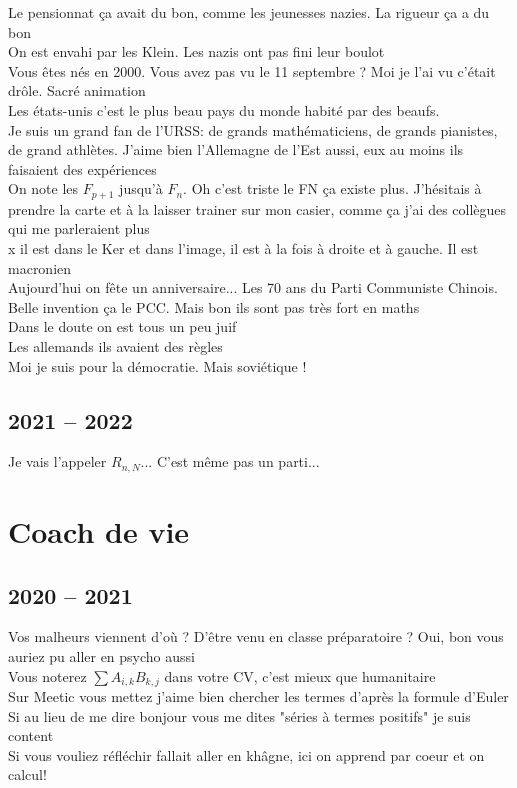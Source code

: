 \documentclass[french, a4paper, openany]{book}
\begin{document}
	\noindent \og Le pensionnat ça avait du bon, comme les jeunesses nazies. La rigueur ça a du bon \fg \\
	\og On est envahi par les Klein. Les nazis ont pas fini leur boulot \fg \\
	\og Vous êtes nés en 2000. Vous avez pas vu le 11 septembre ? Moi je l'ai vu c'était drôle. Sacré animation \fg \\
	\og Les états-unis c'est le plus beau pays du monde habité par des beaufs. \fg \\
	\og Je suis un grand fan de l'URSS: de grands mathématiciens, de grands pianistes, de grand athlètes. J'aime bien l'Allemagne de l'Est aussi, eux au moins ils faisaient des expériences \fg \\
	\og On note les $F_{p+1}$ jusqu'à $F_n$. Oh c'est triste le FN ça existe plus. J'hésitais à prendre la carte et à la laisser trainer sur mon casier, comme ça j'ai des collègues qui me parleraient plus \fg \\
	\og x il est dans le Ker et dans l'image, il est à la fois à droite et à gauche. Il est macronien \fg \\
	\og Aujourd'hui on fête un anniversaire... Les 70 ans du Parti Communiste Chinois. Belle invention ça le PCC. Mais bon ils sont pas très fort en maths \fg \\
	\og Dans le doute on est tous un peu juif \fg \\
	\og Les allemands ils avaient des règles \fg \\
	\og Moi je suis pour la démocratie. Mais soviétique ! \fg \\

\section{2021 -- 2022}

	\noindent \og Je vais l'appeler $R_{n,N}$... C'est même pas un parti... \fg \\

\chapter{Coach de vie}

\section{2020 -- 2021}

	\noindent \og Vos malheurs viennent d'où ? D'être venu en classe préparatoire ? Oui, bon vous auriez pu aller en psycho aussi \fg \\
	\og Vous noterez $\sum A_{i,k} B_{k,j}$ dans votre CV, c'est mieux que humanitaire \fg \\
	\og Sur Meetic vous mettez \og j'aime bien chercher les termes d'après la formule d'Euler \fg \\
	\og Si au lieu de me dire bonjour vous me dites "séries à termes positifs" je suis content \fg \\
	\og Si vous vouliez réfléchir fallait aller en khâgne, ici on apprend par coeur et on calcul! \fg \\
\end{document}
